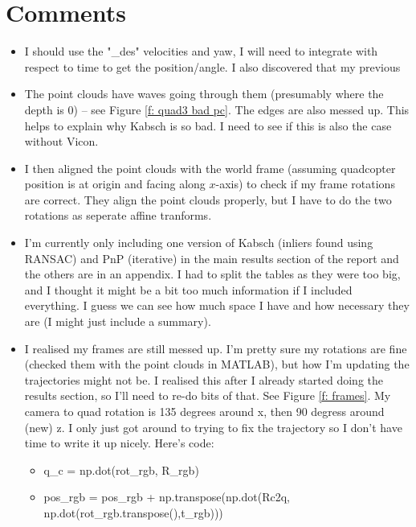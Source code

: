 \documentclass[12pt,a4paper]{article}
\begin{document}
\section{Comments}
\begin{itemize}
  \item I should use the "\_des" velocities and yaw, I will need to integrate with respect to time to get the position/angle. I also discovered that my previous 
  \item The point clouds have waves going through them (presumably where the depth is 0) -- see Figure \ref{f: quad3 bad pc}. The edges are also messed up. This helps to explain why Kabsch is so bad. I need to see if this is also the case without Vicon.
  \item I then aligned the point clouds with the world frame (assuming quadcopter position is at origin and facing along $x$-axis) to check if my frame rotations are correct. They align the point clouds properly, but I have to do the two rotations as seperate affine tranforms.
  \item I'm currently only including one version of Kabsch (inliers found using RANSAC) and PnP (iterative) in the main results section of the report and the others are in an appendix. I had to split the tables as they were too big, and I thought it might be a bit too much information if I included everything. I guess we can see how much space I have and how necessary they are (I might just include a summary).
  \item I realised my frames are still messed up. I'm pretty sure my rotations are fine (checked them with the point clouds in MATLAB), but how I'm updating the trajectories might not be. I realised this after I already started doing the results section, so I'll need to re-do bits of that. See Figure \ref{f: frames}. My camera to quad rotation is 135 degrees around x, then 90 degress around (new) z. I only just got around to trying to fix the trajectory so I don't have time to write it up nicely. Here's code:  
  \begin{itemize}
    \item q_c = np.dot(rot_rgb, R_rgb)
    \item pos_rgb = pos_rgb + np.transpose(np.dot(Rc2q, np.dot(rot_rgb.transpose(),t_rgb)))
  \end{itemize}
\end{itemize}
\end{document}
